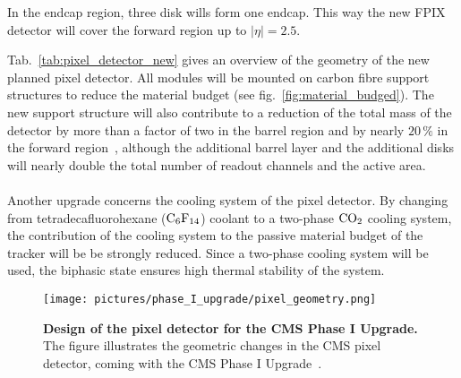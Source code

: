 In the endcap region, three disk wills form one endcap. This way the new \acs{FPIX} detector will cover the forward region up to $|\eta |=2.5$.

Tab.~\ref{tab:pixel_detector_new} gives an overview of the geometry of the new planned pixel detector. All modules will be mounted on carbon fibre support structures to reduce the material budget (see fig.~\ref{fig:material_budged}). The new support structure will also contribute to a reduction of the total mass of the detector by more than a factor of two in the barrel region and by nearly $20\,\%$ in the forward region~\cite{Dom12}, although the additional barrel layer and the additional disks will nearly double the total number of readout channels and the active area.\\
\\Another upgrade concerns the cooling system of the pixel detector. By changing from tetradecafluorohexane ($\rm{C_6F_{14}}$) coolant to a two-phase $\rm{CO_2}$ cooling system, the contribution of the cooling system to the passive material budget of the tracker will be be strongly reduced. Since a two-phase cooling system will be used, the biphasic state ensures high thermal stability of the system.
\begin{figure}
\begin{center}
\texttt{[image: pictures/phase\_I\_upgrade/pixel\_geometry.png]}
\end{center}
\caption[Design of the pixel detector for the CMS Phase I Upgrade]{\textbf{Design of the pixel detector for the \ac{CMS} Phase I Upgrade.} The figure illustrates the geometric changes in the \ac{CMS} pixel detector, coming with the \ac{CMS} Phase I Upgrade~\cite{Dom12}.}\label{fig:pixel_upgrade}
\end{figure}
